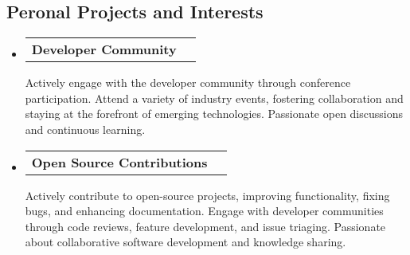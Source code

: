 \documentclass[10pt,letterpaper]{article}
\makeatletter
\newcommand{\headerrow}[2]
{\begin{tabular*}{\linewidth}{l@{\extracolsep{\fill}}r}
  #1 &
  #2 \\
\end{tabular*}}
\makeatother
\begin{document}
\vspace{-0.4em}
\subsection*{Peronal Projects and Interests}
\begin{itemize}
  \parskip=0.1em

  \item
  \headerrow
    {\textbf{Developer Community}}
    {\textbf{}}
    Actively engage with the developer community through conference participation. Attend a variety of industry events, fostering collaboration and staying at the forefront of emerging technologies. Passionate open discussions and continuous learning.
  
    \item
    \headerrow
    {\textbf{Open Source Contributions}}
    {\textbf{}}
    Actively contribute to open-source projects, improving functionality, fixing bugs, and enhancing documentation. Engage with developer communities through code reviews, feature development, and issue triaging. Passionate about collaborative software development and knowledge sharing.
\end{itemize}
\end{document}
